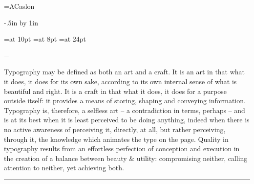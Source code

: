 
%

\newtoks\dspfont
\dspfont={ACaslon} 

\def\fontname{Adobe Caslon}

\def\comment{Drawn by Carol Twombly.}

\parindent0pt
\nopagenumbers
\voffset-.5in
\advance\vsize by 1in

\font\text=\the\dspfont\space at 10pt
\font\tiny=\the\dspfont\space at 8pt
\font\name=\the\dspfont\space at 24pt

\newtoks\ntext
\newtoks\pantext
\newtoks\loremtext
%
\newbox\testbox 
%
\newdimen\bigger 
\newdimen\dspsize 
\newdimen\dspsizeincr 
\newdimen\habcwd
\newdimen\ctextsz
\newdimen\leading 
\newdimen\xheight 
\newdimen\ascheight
\newdimen{} 
\newdimen{}
\newdimen\adjust  {} 
\newdimen\dist
\newdimen\scratchdim
%
\newcount\dsplineno
\newcount\picawd
\newcount\pointwd
\newcount\spconv
\newcount\measure 
\newcount\divisor 
\newcount\scratch
\newcount\sscratch
\newcount\xascrnum
\newcount\intgp
\newcount\fracp
\newcount\scppt {}

\ntext={Typography may be defined as both
an art and a craft. It is an art in that what it does, it does for its
own sake, according to its own internal sense of what is beautiful and
right. It is a craft in that what it does, it does for a purpose
outside itself: it provides a means of storing, shaping and conveying
information. Typography is, therefore, a selfless art -- a
contradiction in terms, perhaps -- and is at its best when it is least
perceived to be doing anything, indeed when there is no active
awareness of perceiving it, directly, at all, but rather perceiving,
through it, the knowledge which animates the type on the page. Quality
in typography results from an effortless perfection of conception and
execution in the creation of a balance between beauty \& utility:
compromising neither, calling attention to neither, yet achieving
both.\thinspace\nobreak\leaders\hrule\hfill\null\par}

